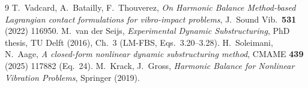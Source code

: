 \documentclass[11pt]{article}
\begin{document}
\begin{thebibliography}{9}
 T.\ Vadcard, A.\ Batailly, F.\ Thouverez,
\emph{On Harmonic Balance Method-based Lagrangian contact formulations for
vibro-impact problems}, J.\ Sound Vib.\ \textbf{531} (2022) 116950.
 M.\ van der Seijs, \emph{Experimental Dynamic
Substructuring}, PhD thesis, TU Delft (2016), Ch.~3 (LM-FBS, Eqs.~3.20--3.28).
 H.\ Soleimani, N.\ Aage,
\emph{A closed-form nonlinear dynamic substructuring method}, CMAME
\textbf{439} (2025) 117882 (Eq.~24).
 M.\ Krack, J.\ Gross, \emph{Harmonic Balance for
Nonlinear Vibration Problems}, Springer (2019).
\end{thebibliography}
\end{document}

